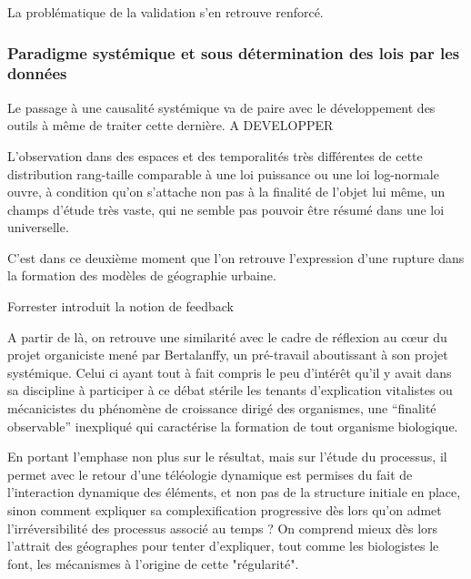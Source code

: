 La problématique de la validation s'en retrouve renforcé.

\subsubsection{Paradigme systémique et sous détermination des lois par les données}

Le passage à une causalité systémique va de paire avec le développement des outils à même de traiter cette dernière. A DEVELOPPER


L'observation dans des espaces et des temporalités très différentes \autocite{Pumain1997} de cette distribution rang-taille comparable à une loi puissance ou une loi log-normale ouvre, à condition qu'on s'attache non pas à la finalité de l'objet lui même, un champs d'étude très vaste, qui ne semble pas pouvoir être résumé dans une loi universelle.



C'est dans ce deuxième moment que l'on retrouve l'expression d'une rupture dans la formation des modèles de géographie urbaine.

Forrester introduit la notion de feedback

A partir de là, on retrouve une similarité avec le cadre de réflexion au cœur du projet organiciste mené par Bertalanffy, un pré-travail aboutissant à son projet systémique. Celui ci ayant tout à fait compris le peu d’intérêt qu'il y avait dans sa discipline à participer à ce débat stérile les tenants d'explication vitalistes ou mécanicistes du phénomène de croissance dirigé des organismes, une \enquote{finalité observable} inexpliqué qui caractérise la formation de tout organisme biologique. 

En portant l'emphase non plus sur le résultat, mais sur l'étude du processus, il permet avec le retour d'une téléologie dynamique est permises du fait de l'interaction dynamique des éléments, et non pas de la structure initiale en place, sinon comment expliquer sa complexification progressive dès lors qu'on admet l'irréversibilité des processus associé au temps ? On comprend mieux dès lors l'attrait des géographes pour tenter d'expliquer, tout comme les biologistes le font, les mécanismes à l'origine de cette "régularité".

